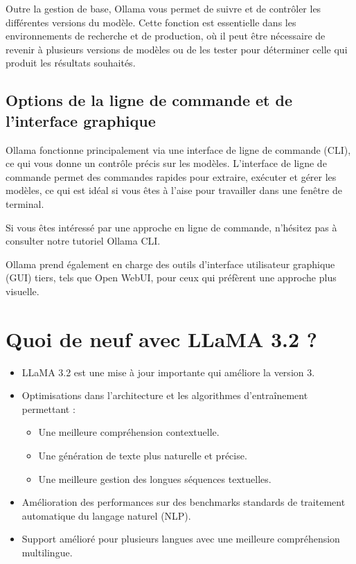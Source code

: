 \medskip

Outre la gestion de base, Ollama vous permet de suivre et de contrôler les différentes versions du modèle. Cette fonction est essentielle dans les environnements de recherche et de production, où il peut être nécessaire de revenir à plusieurs versions de modèles ou de les tester pour déterminer celle qui produit les résultats souhaités.

\subsection*{Options de la ligne de commande et de l’interface graphique}

Ollama fonctionne principalement via une interface de ligne de commande (CLI), ce qui vous donne un contrôle précis sur les modèles. L’interface de ligne de commande permet des commandes rapides pour extraire, exécuter et gérer les modèles, ce qui est idéal si vous êtes à l’aise pour travailler dans une fenêtre de terminal.

\medskip

Si vous êtes intéressé par une approche en ligne de commande, n’hésitez pas à consulter notre tutoriel Ollama CLI.

\medskip

Ollama prend également en charge des outils d’interface utilisateur graphique (GUI) tiers, tels que Open WebUI, pour ceux qui préfèrent une approche plus visuelle.

\section{Quoi de neuf avec LLaMA 3.2 ?}
\begin{itemize}
    \item LLaMA 3.2 est une mise à jour importante qui améliore la version 3.
    \item Optimisations dans l’architecture et les algorithmes d’entraînement permettant :
    \begin{itemize}
        \item Une meilleure compréhension contextuelle.
        \item Une génération de texte plus naturelle et précise.
        \item Une meilleure gestion des longues séquences textuelles.
    \end{itemize}
    \item Amélioration des performances sur des benchmarks standards de traitement automatique du langage naturel (NLP).
    \item Support amélioré pour plusieurs langues avec une meilleure compréhension multilingue.
\end{itemize}

